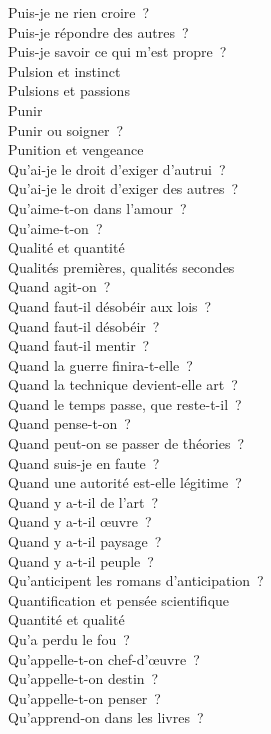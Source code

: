 \documentclass[a4paper,12pt]{article}
\begin{document}
Puis-je ne rien croire ? \\
Puis-je répondre des autres ? \\
Puis-je savoir ce qui m'est propre ? \\
Pulsion et instinct \\
Pulsions et passions \\
Punir \\
Punir ou soigner ? \\
Punition et vengeance \\
Qu'ai-je le droit d'exiger d'autrui ? \\
Qu'ai-je le droit d'exiger des autres ? \\
Qu'aime-t-on dans l'amour ? \\
Qu'aime-t-on ? \\
Qualité et quantité \\
Qualités premières, qualités secondes \\
Quand agit-on ? \\
Quand faut-il désobéir aux lois ? \\
Quand faut-il désobéir ? \\
Quand faut-il mentir ? \\
Quand la guerre finira-t-elle ? \\
Quand la technique devient-elle art ? \\
Quand le temps passe, que reste-t-il ? \\
Quand pense-t-on ? \\
Quand peut-on se passer de théories ? \\
Quand suis-je en faute ? \\
Quand une autorité est-elle légitime ? \\
Quand y a-t-il de l'art ? \\
Quand y a-t-il œuvre ? \\
Quand y a-t-il paysage ? \\
Quand y a-t-il peuple ? \\
Qu'anticipent les romans d'anticipation ? \\
Quantification et pensée scientifique \\
Quantité et qualité \\
Qu'a perdu le fou ? \\
Qu'appelle-t-on chef-d'œuvre ? \\
Qu'appelle-t-on destin ? \\
Qu'appelle-t-on penser ? \\
Qu'apprend-on dans les livres ? \\
\end{document}
